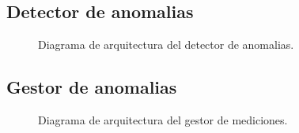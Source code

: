 \documentclass{article}
\theoremstyle{definition}
\theoremstyle{remark}
\begin{document}
\subsection{Detector de anomalias}

\begin{figure}[H]
	\caption{Diagrama de arquitectura del detector de anomalias.}
\end{figure}

\subsection{Gestor de anomalias}

\begin{figure}[H]
	\caption{Diagrama de arquitectura del gestor de mediciones.}
\end{figure}
\end{document}
